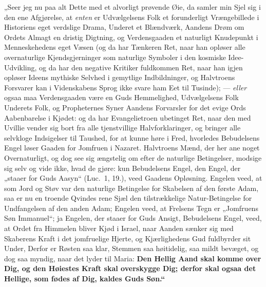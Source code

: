 \documentclass[12pt,a4paper]{book}
\begin{document}
„Seer jeg nu paa alt Dette med et alvorligt prøvende Øie, da samler min Sjel sig
i den ene Afgjørelse, at \emph{enten} er Udvælgelsens Folk et forunderligt
Vrængebillede i Historiens eget verdslige Drama, Underet et Blændværk, Aandens
Drøm om Ordets Almagt en dristig Digtning, og Verdensgaaden et naturligt
Knudepunkt i Menneskehedens eget Væsen (og da har Tænkeren Ret, naar han opløser
alle overnaturlige Kjendsgjerninger som naturlige Symboler i den kosmiske
Idee-Udvikling, og da har den negative Kritiker fuldkommen Ret, naar han igjen
opløser Ideens mythiske Selvhed i gemytlige Indbildninger, og Halvtroens
Forsvarer kan i Videnskabens Sprog ikke svare ham Eet til Tusinde); ---
\emph{eller} ogsaa maa Verdensgaaden være en Guds Hemmelighed, Udvælgelsens Folk
Underets Folk, og Propheternes Syner Aandens Forvarsler for det evige Ords
Aabenbarelse i Kjødet: og da har Evangelietroen ubetinget Ret, naar den med
Uvillie vender sig bort fra alle tjenstvillige Halvforklaringer, og bringer alle
selvkloge Indsigelser til Taushed, for at kunne høre i Fred, hvorledes
Bebudelsens Engel løser Gaaden for Jomfruen i Nazaret. Halvtroens Mænd, der her
ane noget Overnaturligt, og dog see sig ængstelig om efter de naturlige
Betingelser, modsige sig selv og vide ikke, hvad de gjøre: kun Bebudelsens
Engel, den Engel, der „staaer for Guds Aasyn“ (Luc.\ 1, 19.), veed Gaadens
Opløsning. Engelen veed, at som Jord og Støv var den naturlige Betingelse for
Skabelsen af den første Adam, saa er nu en troende Qvindes rene Sjæl den
tilstrækkelige Natur-Betingelse for Undfangelsen af den anden Adam; Engelen
veed, at Frelsens Tegn er „Jomfruens Søn Immanuel“; ja Engelen, der staaer for
Guds Ansigt, Bebudelsens Engel, veed, at Ordet fra Himmelen bliver Kjød i
Israel, naar Aanden sænker sig med Skaberens Kraft i det jomfruelige Hjerte, og
Kjærlighedens Gud fuldbyrder sit Under,
Derfor er Røsten saa klar, Stemmen saa høitidelig, saa mildt bevæget, og dog saa
myndig, naar det lyder til Maria: \textbf{Den Hellig Aand skal komme over Dig,
og den Høiestes Kraft skal overskygge Dig; derfor skal ogsaa det Hellige, som
fødes af Dig, kaldes Guds Søn.“}
\end{document}
